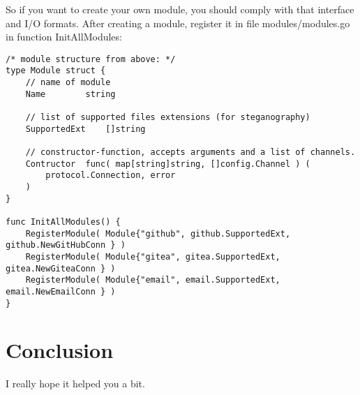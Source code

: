 \documentclass{article}
\begin{document}
	So if you want to create your own module, you should comply with that interface and I/O formats.
	After creating a module, register it in file modules/modules.go in function InitAllModules:
	\begin{lstlisting}
/* module structure from above: */
type Module struct {
	// name of module
	Name		string
	
	// list of supported files extensions (for steganography)
	SupportedExt	[]string	

	// constructor-function, accepts arguments and a list of channels.
	Contructor	func( map[string]string, []config.Channel ) (
		protocol.Connection, error
	)
}

func InitAllModules() {
	RegisterModule( Module{"github", github.SupportedExt, github.NewGitHubConn } )
	RegisterModule( Module{"gitea", gitea.SupportedExt, gitea.NewGiteaConn } )
	RegisterModule( Module{"email", email.SupportedExt, email.NewEmailConn } )
}
	\end{lstlisting}

\section{Conclusion}
	I really hope it helped you a bit.
\end{document}
